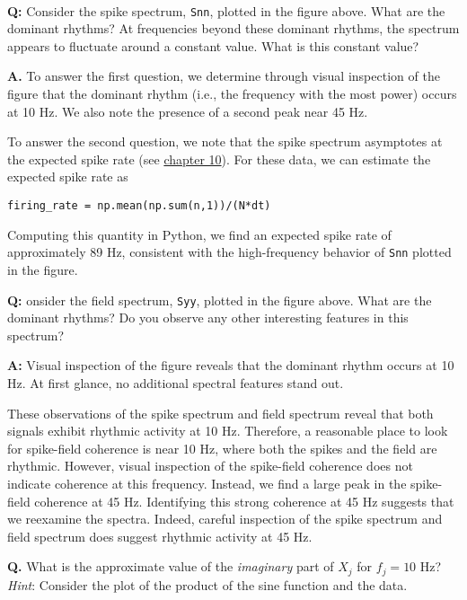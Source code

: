 \documentclass[11pt]{article}
\begin{document}
    \begin{center}
    \end{center}
    { \hspace*{\fill} \\}
    
    \textbf{Q:} Consider the spike spectrum, \texttt{Snn}, plotted in the
figure above. What are the dominant rhythms? At frequencies beyond these
dominant rhythms, the spectrum appears to fluctuate around a constant
value. What is this constant value?

\textbf{A.} To answer the first question, we determine through visual
inspection of the figure that the dominant rhythm (i.e., the frequency
with the most power) occurs at 10 Hz. We also note the presence of a
second peak near 45 Hz.

To answer the second question, we note that the spike spectrum
asymptotes at the expected spike rate (see \href{add\%20ref}{chapter
10}). For these data, we can estimate the expected spike rate as

\texttt{firing\_rate\ =\ np.mean(np.sum(n,1))/(N*dt)}

Computing this quantity in Python, we find an expected spike rate of
approximately 89 Hz, consistent with the high-frequency behavior of
\texttt{Snn} plotted in the figure.

    \textbf{Q:} onsider the field spectrum, \texttt{Syy}, plotted in the
figure above. What are the dominant rhythms? Do you observe any other
interesting features in this spectrum?

\textbf{A:} Visual inspection of the figure reveals that the dominant
rhythm occurs at 10 Hz. At first glance, no additional spectral features
stand out.

    These observations of the spike spectrum and field spectrum reveal that
both signals exhibit rhythmic activity at 10 Hz. Therefore, a reasonable
place to look for spike-field coherence is near 10 Hz, where both the
spikes and the field are rhythmic. However, visual inspection of the
spike-field coherence does not indicate coherence at this frequency.
Instead, we find a large peak in the spike-field coherence at 45 Hz.
Identifying this strong coherence at 45 Hz suggests that we reexamine
the spectra. Indeed, careful inspection of the spike spectrum and field
spectrum does suggest rhythmic activity at 45 Hz.

    \textbf{Q.} What is the approximate value of the \emph{imaginary} part
of \(X_j\) for \(f_j = 10\) Hz? \emph{Hint}: Consider the plot of the
product of the sine function and the data.
\end{document}
